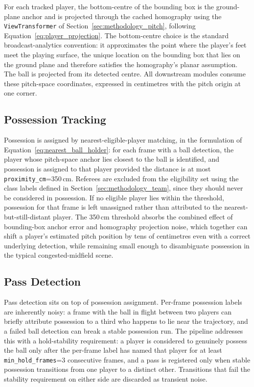 For each tracked player, the bottom-centre of the bounding box is the
ground-plane anchor and is projected through the cached homography using
the \texttt{ViewTransformer} of Section~\ref{sec:methodology_pitch},
following Equation~\ref{eq:player_projection}. The bottom-centre choice is
the standard broadcast-analytics convention: it approximates the point
where the player's feet meet the playing surface, the unique location on
the bounding box that lies on the ground plane and therefore satisfies the
homography's planar assumption. The ball is projected from its detected
centre. All downstream modules consume these pitch-space coordinates,
expressed in centimetres with the pitch origin at one corner.

\subsection{Possession Tracking}
\label{subsec:methodology_possession}

Possession is assigned by nearest-eligible-player matching, in the
formulation of Equation~\ref{eq:nearest_ball_holder}: for each frame with a
ball detection, the player whose pitch-space anchor lies closest to the
ball is identified, and possession is assigned to that player provided the
distance is at most \texttt{proximity\_cm}=350\,cm. Referees are excluded from 
the eligibility set using the class labels defined in Section~\ref{sec:methodology_team}, since 
they should never be considered in possession. If no
eligible player lies within the threshold, possession for that frame is
left unassigned rather than attributed to the nearest-but-still-distant
player. The 350\,cm threshold absorbs the combined effect of bounding-box
anchor error and homography projection noise, which together can shift a
player's estimated pitch position by tens of centimetres even with a
correct underlying detection, while remaining small enough to disambiguate
possession in the typical congested-midfield scene.

\subsection{Pass Detection}
\label{subsec:methodology_passes}

Pass detection sits on top of possession assignment. Per-frame possession
labels are inherently noisy: a frame with the ball in flight between two
players can briefly attribute possession to a third who happens to lie near
the trajectory, and a failed ball detection can break a stable possession
run. The pipeline addresses this with a hold-stability requirement: a
player is considered to genuinely possess the ball only after the per-frame
label has named that player for at least \texttt{min\_hold\_frames}=3
consecutive frames, and a pass is registered only when stable possession
transitions from one player to a distinct other. Transitions that fail the
stability requirement on either side are discarded as transient noise.

